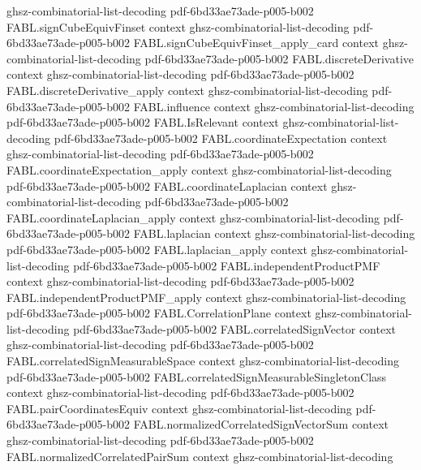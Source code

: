 \begin{theorem}
  {ghsz-combinatorial-list-decoding}
  {pdf-6bd33ae73ade-p005-b002}
\proofstep
  {FABL.signCubeEquivFinset}
  {context}
  {ghsz-combinatorial-list-decoding}
  {pdf-6bd33ae73ade-p005-b002}
\proofstep
  {FABL.signCubeEquivFinset_apply_card}
  {context}
  {ghsz-combinatorial-list-decoding}
  {pdf-6bd33ae73ade-p005-b002}
\proofstep
  {FABL.discreteDerivative}
  {context}
  {ghsz-combinatorial-list-decoding}
  {pdf-6bd33ae73ade-p005-b002}
\proofstep
  {FABL.discreteDerivative_apply}
  {context}
  {ghsz-combinatorial-list-decoding}
  {pdf-6bd33ae73ade-p005-b002}
\proofstep
  {FABL.influence}
  {context}
  {ghsz-combinatorial-list-decoding}
  {pdf-6bd33ae73ade-p005-b002}
\proofstep
  {FABL.IsRelevant}
  {context}
  {ghsz-combinatorial-list-decoding}
  {pdf-6bd33ae73ade-p005-b002}
\proofstep
  {FABL.coordinateExpectation}
  {context}
  {ghsz-combinatorial-list-decoding}
  {pdf-6bd33ae73ade-p005-b002}
\proofstep
  {FABL.coordinateExpectation_apply}
  {context}
  {ghsz-combinatorial-list-decoding}
  {pdf-6bd33ae73ade-p005-b002}
\proofstep
  {FABL.coordinateLaplacian}
  {context}
  {ghsz-combinatorial-list-decoding}
  {pdf-6bd33ae73ade-p005-b002}
\proofstep
  {FABL.coordinateLaplacian_apply}
  {context}
  {ghsz-combinatorial-list-decoding}
  {pdf-6bd33ae73ade-p005-b002}
\proofstep
  {FABL.laplacian}
  {context}
  {ghsz-combinatorial-list-decoding}
  {pdf-6bd33ae73ade-p005-b002}
\proofstep
  {FABL.laplacian_apply}
  {context}
  {ghsz-combinatorial-list-decoding}
  {pdf-6bd33ae73ade-p005-b002}
\proofstep
  {FABL.independentProductPMF}
  {context}
  {ghsz-combinatorial-list-decoding}
  {pdf-6bd33ae73ade-p005-b002}
\proofstep
  {FABL.independentProductPMF_apply}
  {context}
  {ghsz-combinatorial-list-decoding}
  {pdf-6bd33ae73ade-p005-b002}
\proofstep
  {FABL.CorrelationPlane}
  {context}
  {ghsz-combinatorial-list-decoding}
  {pdf-6bd33ae73ade-p005-b002}
\proofstep
  {FABL.correlatedSignVector}
  {context}
  {ghsz-combinatorial-list-decoding}
  {pdf-6bd33ae73ade-p005-b002}
\proofstep
  {FABL.correlatedSignMeasurableSpace}
  {context}
  {ghsz-combinatorial-list-decoding}
  {pdf-6bd33ae73ade-p005-b002}
\proofstep
  {FABL.correlatedSignMeasurableSingletonClass}
  {context}
  {ghsz-combinatorial-list-decoding}
  {pdf-6bd33ae73ade-p005-b002}
\proofstep
  {FABL.pairCoordinatesEquiv}
  {context}
  {ghsz-combinatorial-list-decoding}
  {pdf-6bd33ae73ade-p005-b002}
\proofstep
  {FABL.normalizedCorrelatedSignVectorSum}
  {context}
  {ghsz-combinatorial-list-decoding}
  {pdf-6bd33ae73ade-p005-b002}
\proofstep
  {FABL.normalizedCorrelatedPairSum}
  {context}
  {ghsz-combinatorial-list-decoding}

\end{theorem}
